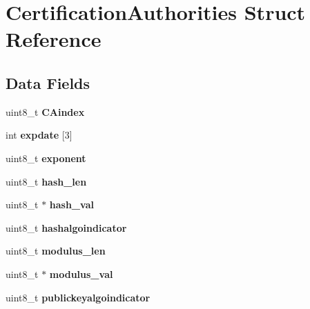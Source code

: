 \hypertarget{struct_certification_authorities}{}\section{Certification\+Authorities Struct Reference}
\label{struct_certification_authorities}
\subsection*{Data Fields}
\begin{DoxyCompactItemize}
\item 
\hypertarget{struct_certification_authorities_a9414fe6ffc23bcd6aecf04b73815de4c}{}\label{struct_certification_authorities_a9414fe6ffc23bcd6aecf04b73815de4c} 
uint8\+\_\+t {\bfseries C\+Aindex}
\item 
\hypertarget{struct_certification_authorities_a74db2d4c720927689793d17e8f7aa201}{}\label{struct_certification_authorities_a74db2d4c720927689793d17e8f7aa201} 
int {\bfseries expdate} \mbox{[}3\mbox{]}
\item 
\hypertarget{struct_certification_authorities_af05d5abe7656953548edfb3eb5117659}{}\label{struct_certification_authorities_af05d5abe7656953548edfb3eb5117659} 
uint8\+\_\+t {\bfseries exponent}
\item 
\hypertarget{struct_certification_authorities_a759b7e96d51c83032b1b2b3b044c603b}{}\label{struct_certification_authorities_a759b7e96d51c83032b1b2b3b044c603b} 
uint8\+\_\+t {\bfseries hash\+\_\+len}
\item 
\hypertarget{struct_certification_authorities_a0e534707786c3202ce6e8b7e0e09fcfc}{}\label{struct_certification_authorities_a0e534707786c3202ce6e8b7e0e09fcfc} 
uint8\+\_\+t $\ast$ {\bfseries hash\+\_\+val}
\item 
\hypertarget{struct_certification_authorities_acb88a5708b7b7b661cbf957c102af84d}{}\label{struct_certification_authorities_acb88a5708b7b7b661cbf957c102af84d} 
uint8\+\_\+t {\bfseries hashalgoindicator}
\item 
\hypertarget{struct_certification_authorities_a284a4fa5e7ccf25f33e813d99e72e1e0}{}\label{struct_certification_authorities_a284a4fa5e7ccf25f33e813d99e72e1e0} 
uint8\+\_\+t {\bfseries modulus\+\_\+len}
\item 
\hypertarget{struct_certification_authorities_ababec13341cbe30053f9f6b21de153e9}{}\label{struct_certification_authorities_ababec13341cbe30053f9f6b21de153e9} 
uint8\+\_\+t $\ast$ {\bfseries modulus\+\_\+val}
\item 
\hypertarget{struct_certification_authorities_a3a073291e447e9d7472092cb8d2d2e26}{}\label{struct_certification_authorities_a3a073291e447e9d7472092cb8d2d2e26} 
uint8\+\_\+t {\bfseries publickeyalgoindicator}
\end{DoxyCompactItemize}


